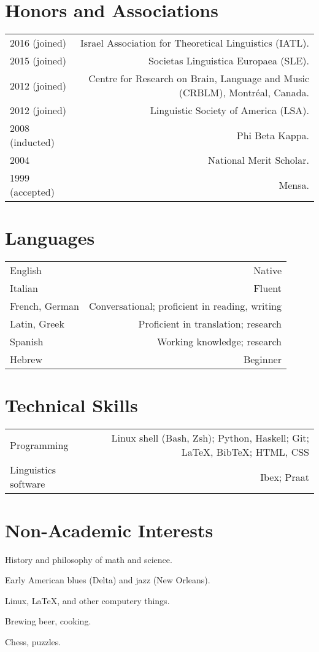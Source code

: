\documentclass[11pt,letterpaper,twoside]{article}
\makeatletter
\newenvironment{cvsection}{%
  \setlength{\extrarowheight}{0.70ex}
  \begin{longtable}[l]{@{} L R @{}}
}{%
  \end{longtable}
}
\makeatother
\begin{document}
\section*{Honors and Associations}

\begin{cvsection}
  2016 {\footnotesize (joined)} & Israel Association for Theoretical Linguistics (IATL).\\
  2015 {\footnotesize (joined)} & Societas Linguistica Europaea (SLE).\\
  2012 {\footnotesize (joined)} & Centre for Research on Brain, Language and Music (CRBLM), Montr\'{e}al, Canada.\\
  2012 {\footnotesize (joined)} & Linguistic Society of America (LSA).\\
  2008 {\footnotesize (inducted)} & Phi Beta Kappa.\\
  2004 & National Merit Scholar.\\
  1999 {\footnotesize (accepted)} & Mensa.\\
\end{cvsection}

\section*{Languages}

\begin{cvsection}
  English & Native\\
  Italian & Fluent\\
  French, German & Conversational; proficient in reading, writing\\
  Latin, Greek & Proficient in translation; research\\
  Spanish & Working knowledge; research\\
  Hebrew & Beginner\\
\end{cvsection}

\section*{Technical Skills}

\begin{cvsection}
  Programming & Linux shell (Bash, Zsh); Python, Haskell; Git; \LaTeX, Bib\TeX; HTML, CSS\\
  Linguistics software & Ibex; Praat\\
\end{cvsection}

\section*{Non-Academic Interests}

\begin{list}{}{\leftmargin=0pt}
  \item History and philosophy of math and science.
  \item Early American blues (Delta) and jazz (New Orleans).
  \item Linux, \LaTeX{}, and other computery things.
  \item Brewing beer, cooking.
  \item Chess, puzzles.
\end{list}
\end{document}
